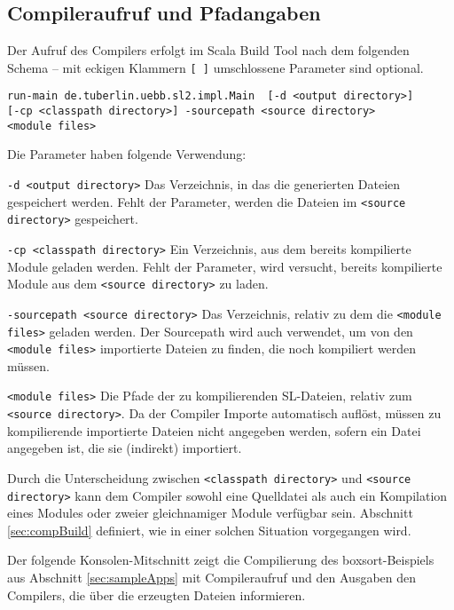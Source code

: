 \documentclass[runningheads]{llncs}
\begin{document}
\subsection{Compileraufruf und Pfadangaben}
\label{sec:compInvoc}

Der Aufruf des Compilers erfolgt im Scala Build Tool nach dem
folgenden Schema -- mit eckigen Klammern \texttt{[ ]} umschlossene
Parameter sind optional.

\begin{verbatim}
run-main de.tuberlin.uebb.sl2.impl.Main  [-d <output directory>]
[-cp <classpath directory>] -sourcepath <source directory>
<module files>
\end{verbatim}

\noindent Die Parameter haben folgende Verwendung:
\begin{description}
\item{\texttt{-d <output directory>}} Das Verzeichnis, in das die
    generierten Dateien gespeichert werden. Fehlt der Parameter,
    werden die Dateien im \texttt{<source directory>} gespeichert.
\item{\texttt{-cp <classpath directory>}} Ein Verzeichnis, aus dem
    bereits kompilierte Module geladen werden. Fehlt der Parameter,
    wird versucht, bereits kompilierte Module aus dem \texttt{<source
    directory>} zu laden.
\item{\texttt{-sourcepath <source directory>}} Das Verzeichnis,
    relativ zu dem die \texttt{<module files>} geladen werden. Der
    Sourcepath wird auch verwendet, um von den \texttt{<module files>}
    importierte Dateien zu finden, die noch kompiliert werden müssen.
\item{\texttt{<module files>}} Die Pfade der zu kompilierenden
    SL-Dateien, relativ zum \texttt{<source directory>}. Da der
    Compiler Importe automatisch auflöst, müssen zu kompilierende
    importierte Dateien nicht angegeben werden, sofern ein Datei
    angegeben ist, die sie (indirekt) importiert.
\end{description}

Durch die Unterscheidung zwischen \texttt{<classpath
directory>} und \texttt{<source directory>} kann dem Compiler sowohl
eine Quelldatei als auch ein Kompilation eines Modules oder zweier
gleichnamiger Module verfügbar sein. Abschnitt \ref{sec:compBuild}
definiert, wie in einer solchen Situation vorgegangen wird.

Der folgende Konsolen-Mitschnitt zeigt die Compilierung des
boxsort-Beispiels aus Abschnitt \ref{sec:sampleApps} mit
Compileraufruf und den Ausgaben den Compilers, die über die erzeugten
Dateien informieren.
\end{document}
